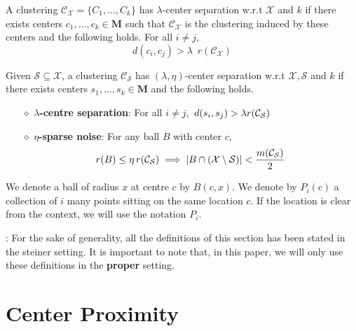 \documentclass[anon,12pt]{colt2016} %
\newcommand{\mc}{\mathcal}
\newcommand{\mb}{\mathbf}
\begin{document}
\begin{definition}
\label{defn:lambdacs}
A clustering $\mc C_{\mc X} = \{C_1, \ldots, C_k\}$ has $\lambda$-center separation w.r.t $\mc X$ and $k$ if there exists centers $c_1, \ldots, c_k \in \mb M$ such that $\mc C_{\mc X}$ is the clustering induced by these centers and the following holds. For all $i\neq j$, 
$$d(c_i, c_j) > \lambda \enspace r(\mc{C}_{\mc{X}})$$
\end{definition}

\begin{definition}
Given $\mc S \subseteq \mc X$, a clustering $\mc C_{\mc S}$ has $(\lambda, \eta)$-center separation w.r.t $\mc X, \mc S$ and $k$ if there exists centers $s_1, \ldots, s_k \in \mb M$ and the following holds.

\begin{itemize}[nolistsep, noitemsep]
\label{defn:lambdacsnoise}	

\item[$\diamond$] {\bf $\lambda$-centre separation}: For all $i\neq j$, $\thinspace d(s_i, s_j) > \lambda r({\mc C}_{\mc S})$
\item[$\diamond$]{\bf $\eta$-sparse noise}: For any ball $B$ with center $c$, 
\vspace{-0.1in}\begin{align*}
r(B)\leq \eta \thinspace r(\mc{C}_{\mc S}) \implies |B\cap (\mc X\setminus \mc S)| < \frac{m(\mc C_{\mc S})}{2}
\end{align*}
\end{itemize}
\end{definition}

We denote a ball of radius $x$ at centre $c$ by $B(c, x)$. We denote by $P_{i}(c)$ a collection of $i$ many points sitting on the same location $c$. If the location is clear from the context, we will use the notation $P_i$.

: For the sake of generality, all the definitions of this section has been stated in the steiner setting. It is important to note that, in this paper, we will only use these definitions in the {\bf proper} setting.



\section{Center Proximity}
\label{section:cp}
\end{document}
